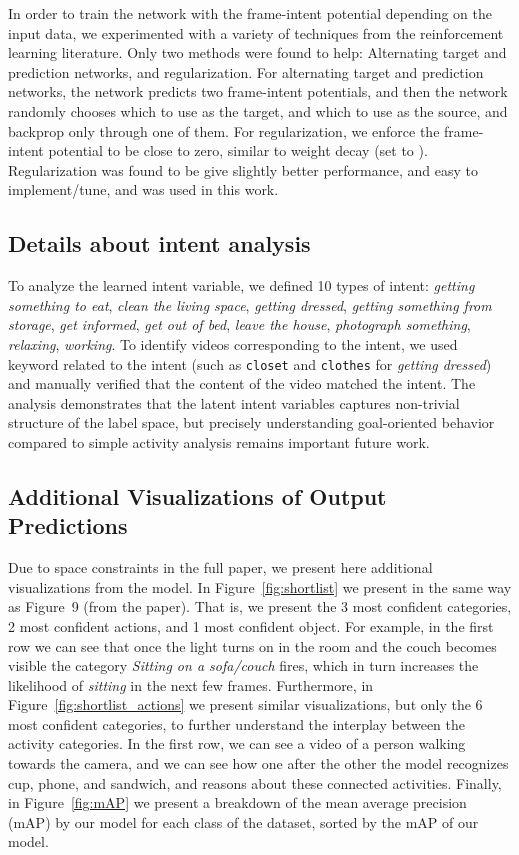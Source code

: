 \documentclass[10pt,twocolumn,letterpaper]{article}
\begin{document}
In order to train the network with the frame-intent potential depending on the input data, we experimented with a variety of techniques from the reinforcement learning literature. Only two methods were found to help: Alternating target and prediction networks, and regularization. For alternating target and prediction networks, the network predicts two frame-intent potentials, and then the network randomly chooses which to use as the target, and which to use as the source, and backprop only through one of them. For regularization, we enforce the frame-intent potential to be close to zero, similar to weight decay (set to ). Regularization was found to be give slightly better performance, and easy to implement/tune, and was used in this work. 


\subsection{Details about intent analysis}

To analyze the learned intent variable, we defined 10 types of intent: \emph{getting something to eat}, \emph{clean the living space}, \emph{getting dressed}, \emph{getting something from storage}, \emph{get informed}, \emph{get out of bed}, \emph{leave the house}, \emph{photograph something}, \emph{relaxing}, \emph{working}. To identify videos corresponding to the intent, we used keyword related to the intent (such as \texttt{closet} and \texttt{clothes} for \emph{getting dressed}) and manually verified that the content of the video matched the intent. The analysis demonstrates that the latent intent variables captures non-trivial structure of the label space, but precisely understanding goal-oriented behavior compared to simple activity analysis remains important future work.



\subsection{Additional Visualizations of Output Predictions}

Due to space constraints in the full paper, we present here additional visualizations from the model. In Figure~\ref{fig:shortlist} we present in the same way as Figure~9 (from the paper). That is, we present the 3 most confident categories, 2 most confident actions, and 1 most confident object. For example, in the first row we can see that once the light turns on in the room and the couch becomes visible the category \emph{Sitting on a sofa/couch} fires, which in turn increases the likelihood of \emph{sitting} in the next few frames. 
Furthermore, in Figure~\ref{fig:shortlist_actions} we present similar visualizations, but only the 6 most confident categories, to further understand the interplay between the activity categories. In the first row, we can see a video of a person walking towards the camera, and we can see how one after the other the model recognizes cup, phone, and sandwich, and reasons about these connected activities.
Finally, in Figure~\ref{fig:mAP} we present a breakdown of the mean average precision (mAP) by our model for each class of the dataset, sorted by the mAP of our model.
\end{document}
